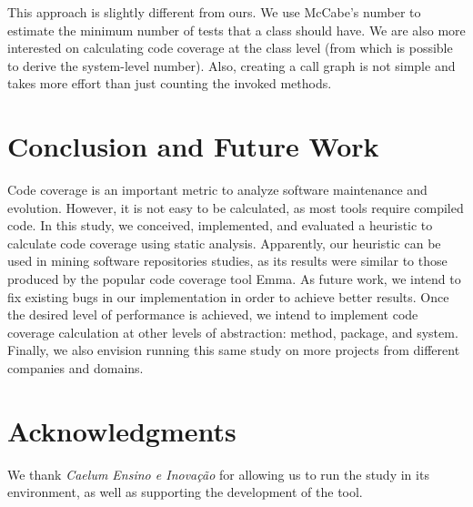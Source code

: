 \documentclass{sig-alternate}
\begin{document}
This approach is slightly different from ours. We use McCabe's number to estimate the
minimum number of tests that a class should have. We are also more interested on calculating
code coverage at the class level (from which is possible to derive the system-level number). 
Also, creating a call graph is not simple and takes more effort than just counting
the invoked methods.

\section{Conclusion and Future Work}
\label{sec-conclusion}

Code coverage is an important metric to analyze software maintenance and evolution. However, it is 
not easy to be calculated, as most tools require compiled code. In this study, we conceived, implemented, 
and evaluated a heuristic to calculate code coverage using static analysis. Apparently, our heuristic can be used 
in mining software repositories studies, as its results were similar to those produced by the popular
code coverage tool Emma. As future work, we intend to fix existing bugs in our implementation in order to
achieve better results. Once the desired level of performance is achieved, we intend to implement code coverage
calculation at other levels of abstraction: method, package, and system. Finally, we also 
envision running this same study on more projects from different companies and domains.

\section{Acknowledgments}

We thank \textit{Caelum Ensino e Inovação} for allowing us to run the study in its environment,
as well as supporting the development of the tool.



\end{document}
